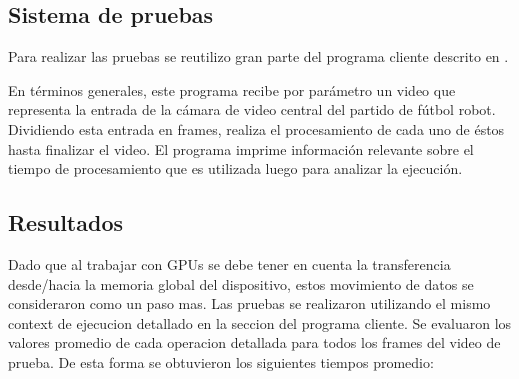\documentclass[a4paper,10pt]{report}
\begin{document}
 
 
 
 
 
 
 
 
 
 
 
 
 
 
\subsection{Sistema de pruebas}
Para realizar las pruebas se reutilizo gran parte del programa cliente descrito en \cite[capitulo 4]{Jaureguiberry}.

En términos generales, este programa recibe por parámetro un video que representa la entrada de la cámara de video central del partido de fútbol robot. 
Dividiendo esta entrada en frames, realiza el procesamiento de cada uno de éstos hasta finalizar el video. El programa imprime información relevante sobre el tiempo de procesamiento que es utilizada luego para analizar la ejecución.


\subsection{Resultados}



Dado que al trabajar con GPUs se debe tener en cuenta la transferencia desde/hacia la memoria global del dispositivo, estos movimiento de datos se consideraron como un paso mas.
Las pruebas se realizaron utilizando el mismo context de ejecucion detallado en la seccion del programa cliente. Se evaluaron los valores promedio de cada operacion detallada para todos los frames del video de prueba.
De esta forma se obtuvieron los siguientes tiempos promedio:
\end{document}

